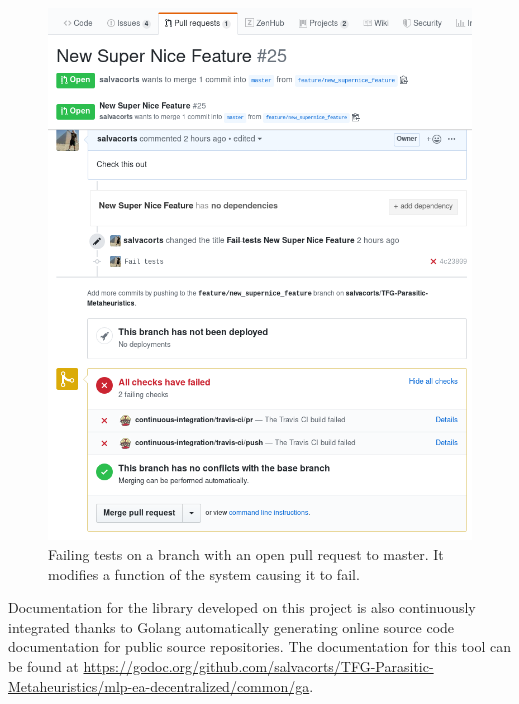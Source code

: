 \begin{figure}[h!]
		\centering
    	\includegraphics[scale=0.35]{assets/images/travis_example.png}
    	\caption{Failing tests on a branch with an open pull request to master. It modifies a function of the system causing it to fail.}
    	\label{fig:travis}
\end{figure}

Documentation for the library developed on this project is also continuously integrated thanks to Golang automatically generating online source code documentation for public source repositories. The documentation for this tool can be found at \href{godoc.org/github.com/salvacorts/TFG-Parasitic-Metaheuristics/mlp-ea-decentralized/common/ga}{https://godoc.org/github.com/salvacorts/TFG-Parasitic-Metaheuristics/mlp-ea-decentralized/common/ga}.
